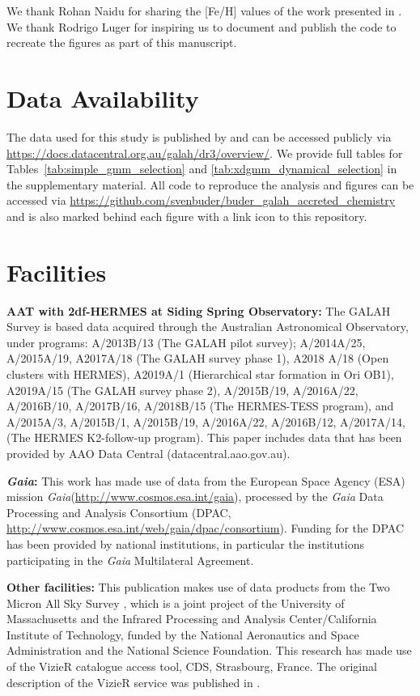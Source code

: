 \documentclass[fleqn,usenatbib]{mnras}
\newcommand{\Gaia}{\textit{Gaia}\xspace} %
\begin{document}
We thank Rohan Naidu for sharing the [Fe/H] values of the work presented in \citet{Naidu2020}. We thank Rodrigo Luger for inspiring us to document and publish the code to recreate the figures as part of this manuscript.

\section*{Data Availability}

The data used for this study is published by \citet{Buder2021} and can be accessed publicly via \url{https://docs.datacentral.org.au/galah/dr3/overview/}.
We provide full tables for Tables~\ref{tab:simple_gmm_selection} and \ref{tab:xdgmm_dynamical_selection} in the supplementary material. All code to reproduce the analysis and figures can be accessed via \url{https://github.com/svenbuder/buder_galah_accreted_chemistry} and is also marked behind each figure with a link icon to this repository.

\section*{Facilities}

\textbf{AAT with 2df-HERMES at Siding Spring Observatory:}
The GALAH Survey is based data acquired through the Australian Astronomical Observatory, under programs: A/2013B/13 (The GALAH pilot survey); A/2014A/25, A/2015A/19, A2017A/18 (The GALAH survey phase 1), A2018 A/18 (Open clusters with HERMES), A2019A/1 (Hierarchical star formation in Ori OB1), A2019A/15 (The GALAH survey phase 2), A/2015B/19, A/2016A/22, A/2016B/10, A/2017B/16, A/2018B/15 (The HERMES-TESS program), and A/2015A/3, A/2015B/1, A/2015B/19, A/2016A/22, A/2016B/12, A/2017A/14, (The HERMES K2-follow-up program). This paper includes data that has been provided by AAO Data Central (datacentral.aao.gov.au).

\textbf{\Gaia: } This work has made use of data from the European Space Agency (ESA) mission \Gaia (\url{http://www.cosmos.esa.int/gaia}), processed by the \Gaia Data Processing and Analysis Consortium (DPAC, \url{http://www.cosmos.esa.int/web/gaia/dpac/consortium}). Funding for the DPAC has been provided by national institutions, in particular the institutions participating in the \Gaia Multilateral Agreement. 

\textbf{Other facilities:} This publication makes use of data products from the Two Micron All Sky Survey \citep{Skrutskie2006}, which is a joint project of the University of Massachusetts and the Infrared Processing and Analysis Center/California Institute of Technology, funded by the National Aeronautics and Space Administration and the National Science Foundation. This research has made use of the VizieR catalogue access tool, CDS, Strasbourg, France. The original description of the VizieR service was published in \citet{Vizier2000}.
\end{document}
